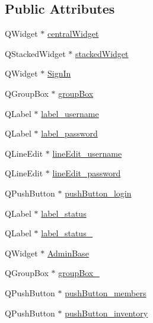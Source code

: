 \subsection*{Public Attributes}
\begin{DoxyCompactItemize}
\item 
Q\+Widget $\ast$ \hyperlink{class_ui___main_window_a30075506c2116c3ed4ff25e07ae75f81}{central\+Widget}
\item 
Q\+Stacked\+Widget $\ast$ \hyperlink{class_ui___main_window_a8d440a6df1de0bc57afcdda7476d8f19}{stacked\+Widget}
\item 
Q\+Widget $\ast$ \hyperlink{class_ui___main_window_a333aea497ac4a8f73f13a21d2cfa2537}{Sign\+In}
\item 
Q\+Group\+Box $\ast$ \hyperlink{class_ui___main_window_aef7cb3be8cecfc9aaf98f036a98781ce}{group\+Box}
\item 
Q\+Label $\ast$ \hyperlink{class_ui___main_window_a6d49f7daea666540c053d26ca7da5889}{label\+\_\+username}
\item 
Q\+Label $\ast$ \hyperlink{class_ui___main_window_a9be21855aae03a522e6ed707afa9c41c}{label\+\_\+password}
\item 
Q\+Line\+Edit $\ast$ \hyperlink{class_ui___main_window_ada6a6ee374998f8c4edc4c5750b690e9}{line\+Edit\+\_\+username}
\item 
Q\+Line\+Edit $\ast$ \hyperlink{class_ui___main_window_ab0fe5a3bb0fbeb730223449fcd69ed27}{line\+Edit\+\_\+password}
\item 
Q\+Push\+Button $\ast$ \hyperlink{class_ui___main_window_ad28b2dacd95cdc7176cc0c702bd26140}{push\+Button\+\_\+login}
\item 
Q\+Label $\ast$ \hyperlink{class_ui___main_window_a93d01ad7a1d88b08e5c22f5b573cf130}{label\+\_\+status}
\item 
Q\+Label $\ast$ \hyperlink{class_ui___main_window_a08bb393932dbb4196e667d716ed41c5f}{label\+\_\+status\+\_}
\item 
Q\+Widget $\ast$ \hyperlink{class_ui___main_window_a9a135a40d5499e76a063f20a0f79376d}{Admin\+Base}
\item 
Q\+Group\+Box $\ast$ \hyperlink{class_ui___main_window_abb28acde35ffce4d0e6152579df2cbc3}{group\+Box\+\_}
\item 
Q\+Push\+Button $\ast$ \hyperlink{class_ui___main_window_a1b69379ef1317f8e3946cc0c67810d6c}{push\+Button\+\_\+members}
\item 
Q\+Push\+Button $\ast$ \hyperlink{class_ui___main_window_a5e47a704222468d92bbe90260a229418}{push\+Button\+\_\+inventory}

\end{DoxyCompactItemize}

